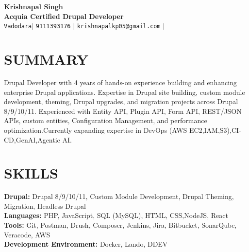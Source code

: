\documentclass[letterpaper, 11pt]{article}
\begin{document}
	\begin{center}
		\textbf{\Huge Krishnapal Singh} \\
		\vspace{5pt}
		\textbf{Acquia Certified Drupal Developer} \\
		\vspace{5pt}
    \faMapMarker* \hspace{2pt}\texttt{Vadodara}$|$ 
		\small \faPhone* \texttt{9111393176} \hspace{1pt} $|$ \hspace{1pt} \faEnvelope
		\hspace{2pt} \texttt{krishnapalkp05@gmail.com} \hspace{1pt} $|$ \hspace{1pt}
		\vspace{-3pt}
	\end{center}


	\section{SUMMARY}

	Drupal Developer with 4 years of hands-on experience building and enhancing enterprise
	Drupal applications. Expertise in Drupal site building, custom module development,
	theming, Drupal upgrades, and migration projects across Drupal 8/9/10/11.
	Experienced with Entity API, Plugin API, Form API, REST/JSON APIs, custom
	entities, Configuration Management, and performance optimization.Currently expanding expertise in DevOps (AWS EC2,IAM,S3),CI-CD,GenAI,Agentic AI.

	\section{SKILLS}
	\begin{itemize}[leftmargin=0in, label={}]
		\small{\item{ \textbf{Drupal:} {Drupal 8/9/10/11, Custom Module Development, Drupal Theming, Migration, Headless Drupal }\vspace{2pt} \\ \textbf{Languages:} {PHP, JavaScript, SQL (MySQL), HTML, CSS,NodeJS, React}\vspace{2pt} \\ \textbf{Tools:} {Git, Postman, Drush, Composer, Jenkins, Jira, Bitbucket, SonarQube, Veracode, AWS}\vspace{2pt}\\ \textbf{Development Environment:} {Docker, Lando, DDEV} }}
	\end{itemize}
\end{document}
